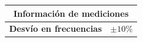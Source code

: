 
\begin{center}
    \renewcommand{\arraystretch}{1.2}
    \begin{tabular}{| m{4cm}| m{3cm} |}
        \hline
        \multicolumn{2}{|c|}{\textbf{Información de mediciones}} \\
        \hline
        {\centering\textbf{Desvío en frecuencias}} &
        {$\pm 10\%$} \\
        \hline
    \end{tabular}
\end{center}


